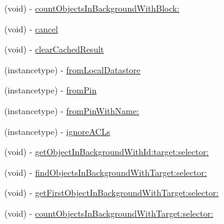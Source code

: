\begin{DoxyCompactItemize}
\begin{DoxyCompactList}
 \end{DoxyCompactList}\item 
(void) -\/ \hyperlink{class_p_f_query_a40c6b7804f90b3698653be546c72fc84}{count\+Objects\+In\+Background\+With\+Block\+:}
\item 
(void) -\/ \hyperlink{class_p_f_query_a27575344e4e9d84bd3fbe1db8cdced39}{cancel}
\begin{DoxyCompactList}\small\item\em 

 \end{DoxyCompactList}\item 
(void) -\/ \hyperlink{class_p_f_query_ae2b639595a93b0170d4c26b6f2f25c93}{clear\+Cached\+Result}
\item 
(instancetype) -\/ \hyperlink{class_p_f_query_a04816c50721c554db2349cfbe637472f}{from\+Local\+Datastore}
\begin{DoxyCompactList}\small\item\em 

 \end{DoxyCompactList}\item 
(instancetype) -\/ \hyperlink{class_p_f_query_aec25334cc9bf9c212e0e0d6587603787}{from\+Pin}
\item 
(instancetype) -\/ \hyperlink{class_p_f_query_ae996e0bc5432da802523435319d7fd9f}{from\+Pin\+With\+Name\+:}
\item 
(instancetype) -\/ \hyperlink{class_p_f_query_a6afc240c9e11505e4703218b5b53a6a2}{ignore\+A\+C\+Ls}
\item 
(void) -\/ \hyperlink{class_p_f_query_a9bc4148cc7b00da6409df69dd89a7563}{get\+Object\+In\+Background\+With\+Id\+:target\+:selector\+:}
\begin{DoxyCompactList}\small\item\em 

 \end{DoxyCompactList}\item 
(void) -\/ \hyperlink{class_p_f_query_afbce3a6936238f6648fb377f42357270}{find\+Objects\+In\+Background\+With\+Target\+:selector\+:}
\begin{DoxyCompactList}\small\item\em 

 \end{DoxyCompactList}\item 
(void) -\/ \hyperlink{class_p_f_query_a24c6281aa758bcbe31e1af11ce68d196}{get\+First\+Object\+In\+Background\+With\+Target\+:selector\+:}
\begin{DoxyCompactList}\small\item\em 

 \end{DoxyCompactList}\item 
(void) -\/ \hyperlink{class_p_f_query_a946b651b581d6044f35a033337dcf543}{count\+Objects\+In\+Background\+With\+Target\+:selector\+:}
\begin{DoxyCompactList}\small\item\em 

 \end{DoxyCompactList}\end{DoxyCompactItemize}
